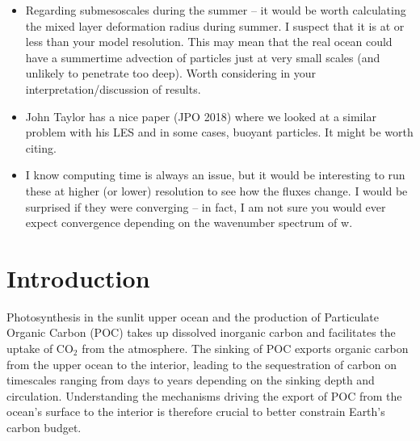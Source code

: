 \documentclass[article,linenumbers]{agujournal2018}
\begin{document}
	\vfill
	
	\pagebreak

	\begin{itemize}
	\item Regarding submesoscales during the summer -- it would be worth calculating the mixed layer deformation radius during summer.  I suspect that it is at or less than your model resolution.  This may mean that the real ocean could have a summertime advection of particles just at very small scales (and unlikely to penetrate too deep).  Worth considering in your interpretation/discussion of results.

	\item John Taylor has a nice paper (JPO 2018) where we looked at a similar problem with his LES and in some cases, buoyant particles. It might be worth citing.

	\item I know computing time is always an issue, but it would be interesting to run these at higher (or lower) resolution to see how the fluxes change.  I would be surprised if they were converging -- in fact, I am not sure you would ever expect convergence depending on the wavenumber spectrum of w.
	\end{itemize}
	
	\pagebreak
	\color{black}
	\section{Introduction}
	
	Photosynthesis in the sunlit upper ocean and the production of Particulate Organic Carbon (POC) takes up dissolved inorganic carbon and facilitates the uptake of CO$_2$ from the atmosphere. The sinking of POC exports organic carbon from the upper ocean to the interior, leading to the sequestration of carbon \citep{Falkowski_1998} on timescales ranging from days to years depending on the sinking depth and  circulation. Understanding the mechanisms driving the export of POC from the ocean's surface to the interior is therefore crucial to better constrain Earth's carbon budget.
	
\end{document}
